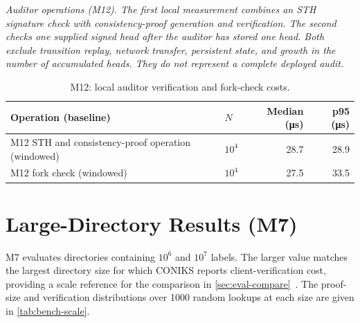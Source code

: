 \medskip\noindent\emph{Auditor operations (M12). The first local measurement combines an STH
signature check with consistency-proof generation and verification. The second checks one supplied
signed head after the auditor has stored one head. Both exclude transition replay, network
transfer, persistent state, and growth in the number of accumulated heads. They do not represent a
complete deployed audit.}

\begin{table}[ht]
\centering
\caption{M12: local auditor verification and fork-check costs.}
\label{tab:bench-auditor}
\small
\begin{tabular}{@{}llrr@{}}
\toprule
Operation (baseline) & $N$ & Median (\si{\micro\second}) & p95 (\si{\micro\second}) \\
\midrule
M12 STH and consistency-proof operation (windowed) & $10^4$ & 28.7 & 28.9 \\
M12 fork check (windowed)  & $10^4$ & 27.5 & 33.5 \\
\bottomrule
\end{tabular}
\end{table}

\section{Large-Directory Results (M7)}\label{sec:bench-scale}

M7 evaluates directories containing $10^6$ and $10^7$ labels. The larger value matches the largest
directory size for which CONIKS reports client-verification cost, providing a scale reference for
the comparison in \cref{sec:eval-compare}~\cite[Section~5.3]{melara2015coniks}. The proof-size and
verification distributions over \num{1000} random lookups at each size are given in
\cref{tab:bench-scale}.

